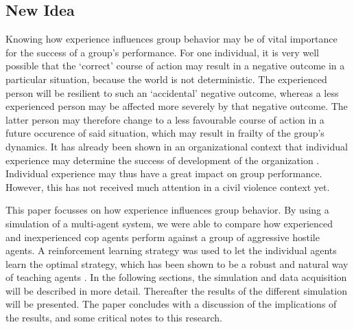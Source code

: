 \subsection{New Idea}
Knowing how experience influences group behavior may be of vital importance for the success of a group's performance.
For one individual, it is very well possible that the `correct' course of action may result in a negative outcome in a particular situation, because the world is not deterministic.
The experienced person will be resilient to such an `accidental' negative outcome, whereas a less experienced person may be affected more severely by that negative outcome.
The latter person may therefore change to a less favourable course of action in a future occurence of said situation, which may result in frailty of the group's dynamics.
It has already been shown in an organizational context that individual experience may determine the success of development of the organization \citep*{reagans2005individual}.
Individual experience may thus have a great impact on group performance.
However, this has not received much attention in a civil violence context yet.

This paper focusses on how experience influences group behavior.
 By using a simulation of a multi-agent system, we were able to compare how experienced and inexperienced cop agents perform against a group of aggressive hostile agents.
 A reinforcement learning strategy was used to let the individual agents learn the optimal strategy, which has been shown to be a robust and natural way of teaching agents \citep{claus1998dynamics}.
 In the following sections, the simulation and data acquisition will be described in more detail.
 Thereafter the results of the different simulation will be presented.
 The paper concludes with a discussion of the implications of the results, and some critical notes to this research.
 
